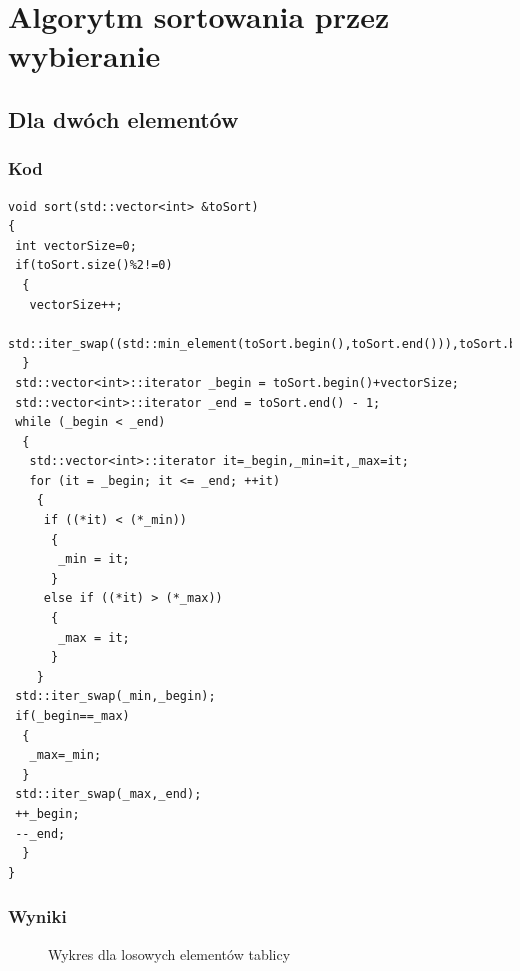\section{Algorytm sortowania przez wybieranie}
\subsection{Dla dwóch elementów}
\subsubsection*{Kod}
\begin{lstlisting}
void sort(std::vector<int> &toSort)
{
 int vectorSize=0;
 if(toSort.size()%2!=0)
  {
   vectorSize++;
   std::iter_swap((std::min_element(toSort.begin(),toSort.end())),toSort.begin());
  }
 std::vector<int>::iterator _begin = toSort.begin()+vectorSize;
 std::vector<int>::iterator _end = toSort.end() - 1;
 while (_begin < _end)
  {
   std::vector<int>::iterator it=_begin,_min=it,_max=it;
   for (it = _begin; it <= _end; ++it)
    {
     if ((*it) < (*_min))
      {
	   _min = it;
	  }
	 else if ((*it) > (*_max))
	  {
	   _max = it;
	  }
    }
 std::iter_swap(_min,_begin);
 if(_begin==_max)
  {
   _max=_min;
  }
 std::iter_swap(_max,_end);
 ++_begin;
 --_end;
  }
}
\end{lstlisting}
\subsubsection*{Wyniki}
\begin{figure}[h!]
  \begin{center}
    \caption{Wykres dla losowych elementów tablicy}
  \end{center}
  \end{figure}
\FloatBarrier



